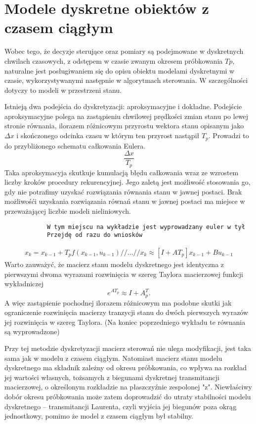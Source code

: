 \documentclass{article}
\begin{document}
	\section{Modele dyskretne obiektów z czasem ciągłym}
		Wobec tego, że decyzje sterujące oraz pomiary są
		podejmowane w dyskretnych chwilach czasowych, z odstępem w czasie zwanym
		okresem próbkowania $Tp$, naturalne jest posługiwaniem się do opisu obiektu modelami
		dyskretnymi w czasie, wykorzystywanymi następnie w algorytmach sterowania. W
		szczególności dotyczy to modeli w przestrzeni stanu.

		Istnieją dwa podejścia do dyskretyzacji: aproksymacyjne i dokładne. Podejście
		aproksymacyjne polega na zastąpieniu chwilowej prędkości zmian stanu po lewej stronie
		równania, ilorazem różnicowym przyrostu wektora stanu opisanym jako $\Delta x$
		i skończonego odcinka czasu w którym ten przyrost nastąpił $T_p$. Prowadzi to do
		przybliżonego schematu całkowania Eulera.
		\begin{equation}
			\frac{\Delta x}{T_p}
		\end{equation}
		Taka aproksymacyja skutkuje kumulacją błędu całkowania
		wraz ze wzrostem liczby kroków procedury rekurencyjnej. Jego zaletą jest możliwość
		stosowania go, gdy nie potrafimy uzyskać rozwiązania równania stanu w jawnej postaci.
		Brak możliwośći uzyskania rozwiązania równań stanu w jawnej postaci ma miejsce w
		przeważającej liczbie modeli nieliniowych.
		\begin{verbatim}
			W tym miejscu na wykładzie jest wyprowadzany euler w tył
			Przejdę od razu do wniosków
		\end{verbatim}
		
		\begin{align*}
			x_k = x_{k-1} + T_pf(x_{k-1}, u_{k-1}) //
			... //
			x_k \approx [I + AT_p] x_{k-1} + B u_{k-1}
		\end{align*}
		Warto zauważyć, że macierz stanu modelu dyskretnego jest identyczna z pierwszymi dwoma
		wyrazami rozwinięcia w szereg Taylora macierzowej funkcji wykładniczej
		\begin{equation}
			e^{AT_p} \approx I +A^T_p .
		\end{equation}
		A więc zastąpienie pochodnej ilorazem różnicowym ma podobne skutki jak ograniczenie
		rozwinięcia macierzy tranzycji stanu do dwóch pierwszych wyrazów jej rozwinięcia w
		szereg Taylora.
		(Na koniec poprzedniego wykładu te równania są wyprowadzone)

		Przy tej metodzie dyskretyzacji macierz sterowań nie ulega modyfikacji, jest taka sama
		jak w modelu z czasem ciągłym. Natomiast macierz stanu modelu dyskretnego ma
		składnik zależny od okresu próbkowania, co wpływa na rozkład jej wartości własnych,
		tożsamych z biegunami dyskretnej transmitancji macierzowej, o określonym rozkładzie
		na płaszczyźnie zespolonej "z". Niewłaściwy dobór okresu próbkowania może zatem
		doprowadzić do utraty stabilności modelu dyskretnego – transmitancji Laurenta, czyli
		wyjścia jej biegunów poza okrąg jednostkowy, pomimo że model z czasem ciągłym był
		stabilny.
\end{document}
